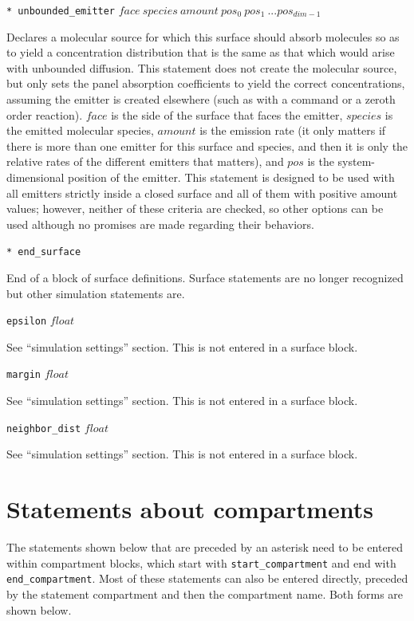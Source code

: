 \documentclass {book}
\newcommand {\ttt} {\texttt}
\begin{document}
\begin{description}
\item{\ttt{* unbounded\_emitter} $face\ species\ amount\ pos_0\ pos_1\ ... pos_{dim-1}$}

Declares a molecular source for which this surface should absorb molecules so as to yield a concentration distribution that is the same as that which would arise with unbounded diffusion. This statement does not create the molecular source, but only sets the panel absorption coefficients to yield the correct concentrations, assuming the emitter is created elsewhere (such as with a command or a zeroth order reaction). $face$ is the side of the surface that faces the emitter, $species$ is the emitted molecular species, $amount$ is the emission rate (it only matters if there is more than one emitter for this surface and species, and then it is only the relative rates of the different emitters that matters), and $pos$ is the system-dimensional position of the emitter. This statement is designed to be used with all emitters strictly inside a closed surface and all of them with positive amount values; however, neither of these criteria are checked, so other options can be used although no promises are made regarding their behaviors.

\item{\ttt{* end\_surface}}

End of a block of surface definitions. Surface statements are no longer recognized but other simulation statements are.

\item{\ttt{epsilon} $float$}

See ``simulation settings'' section. This is not entered in a surface block.

\item{\ttt{margin} $float$}

See ``simulation settings'' section. This is not entered in a surface block.

\item{\ttt{neighbor\_dist} $float$}

See ``simulation settings'' section. This is not entered in a surface block.

\end{description}

\section{Statements about compartments}

The statements shown below that are preceded by an asterisk need to be entered within compartment blocks, which start with \ttt{start\_compartment} and end with \ttt{end\_compartment}. Most of these statements can also be entered directly, preceded by the statement compartment and then the compartment name. Both forms are shown below.
\end{document}
